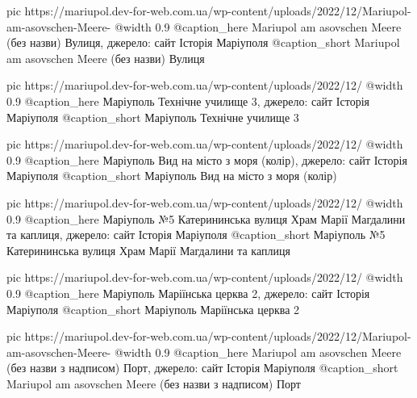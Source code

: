   pic https://mariupol.dev-for-web.com.ua/wp-content/uploads/2022/12/Mariupol-am-asovschen-Meere-%
  @width 0.9
  @caption_here Mariupol am asovschen Meere (без назви) Вулиця, джерело: сайт Історія Маріуполя
  @caption_short Mariupol am asovschen Meere (без назви) Вулиця

  pic https://mariupol.dev-for-web.com.ua/wp-content/uploads/2022/12/%
  @width 0.9
  @caption_here Маріуполь Технічне училище 3, джерело: сайт Історія Маріуполя
  @caption_short Маріуполь Технічне училище 3

  pic https://mariupol.dev-for-web.com.ua/wp-content/uploads/2022/12/%
  @width 0.9
  @caption_here Маріуполь Вид на місто з моря (колір), джерело: сайт Історія Маріуполя
  @caption_short Маріуполь Вид на місто з моря (колір)

  pic https://mariupol.dev-for-web.com.ua/wp-content/uploads/2022/12/%
  @width 0.9
  @caption_here Маріуполь №5 Катерининська вулиця Храм Марії Магдалини та каплиця, джерело: сайт Історія Маріуполя
  @caption_short Маріуполь №5 Катерининська вулиця Храм Марії Магдалини та каплиця

  pic https://mariupol.dev-for-web.com.ua/wp-content/uploads/2022/12/%
  @width 0.9
  @caption_here Маріуполь Маріїнська церква 2, джерело: сайт Історія Маріуполя
  @caption_short Маріуполь Маріїнська церква 2

  pic https://mariupol.dev-for-web.com.ua/wp-content/uploads/2022/12/Mariupol-am-asovschen-Meere-%
  @width 0.9
  @caption_here Mariupol am asovschen Meere (без назви з надписом) Порт, джерело: сайт Історія Маріуполя
  @caption_short Mariupol am asovschen Meere (без назви з надписом) Порт

